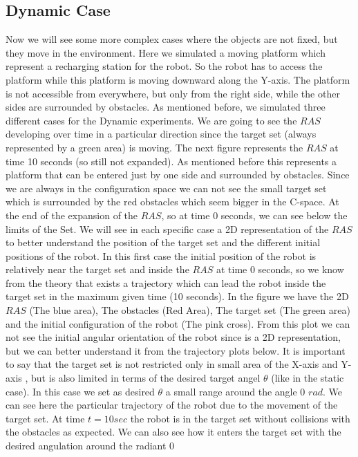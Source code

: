 \subsection{Dynamic Case}
Now we will see some more complex cases where the objects are not fixed, but they move in the environment. Here we simulated a moving platform which represent a recharging station for the robot. So the robot has to access the platform while this platform is moving downward along the Y-axis. The platform is not accessible from everywhere, but only from the right side, while the other sides are surrounded by obstacles. As mentioned before, we simulated three different cases for the Dynamic experiments. We are going to see the $RAS$ developing over time in a particular direction since the target set (always represented by a green area) is moving. The next figure represents the $RAS$ at time 10 seconds (so still not expanded). As mentioned before this represents a platform that can be entered just by one side and surrounded by obstacles. Since we are always in the configuration space we can not see the small target set which is surrounded by the red obstacles which seem bigger in the C-space.
At the end of the expansion of the $RAS$, so at time 0 seconds, we can see below the limits of the Set.
We will see in each specific case a 2D representation of the $RAS$ to better understand the position of the target set and the different initial positions of the robot.
In this first case the initial position of the robot is relatively near the target set and inside the $RAS$ at time 0 seconds, so we know from the theory that exists a trajectory which can lead the robot inside the target set in the maximum given time (10 seconds).
In the figure we have the 2D $RAS$ (The blue area), The obstacles (Red Area), The target set (The green area) and the initial configuration of the robot (The pink cross). From this plot we can not see the initial angular orientation of the robot since is a 2D representation, but we can better understand it from the trajectory plots below. It is important to say that the target set is not restricted only in small area of the X-axis and Y-axis , but is also limited in terms of the desired target angel $\theta$ (like in the static case). In this case we set as desired $\theta$ a small range around the angle 0 $rad$.
We can see here the particular trajectory of the robot due to the movement of the target set. At time $t=10sec$ the robot is in the target set without collisions with the obstacles as expected. We can also see how it enters the target set with the desired angulation around the radiant 0
